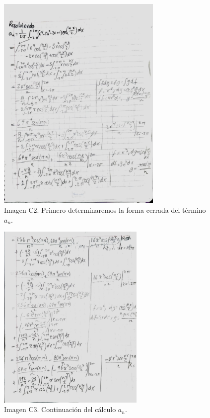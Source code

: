 \begin{figure}[H]
	\centering
	\includegraphics[width=3.12761in,height=4.17188in]{media/image31.jpg}
	\caption{Imagen C2. Primero determinaremos la forma cerrada del término \(a_n\).}
\end{figure}

\begin{figure}[H]
	\centering
	\includegraphics[width=2.78659in,height=3.57813in]{media/image34.jpg}
	\caption{Imagen C3. Continuación del cálculo \(a_n\).}
\end{figure}

